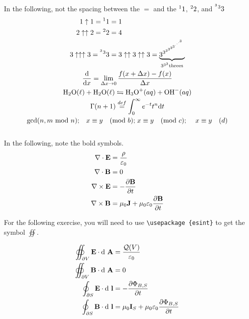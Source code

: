 \documentclass[a4paper]{article}
\newcommand{\ts}{\textsuperscript}
\begin{document}
	In the following, not the spacing between the $=$ and the
	${\ts 1} 1$, ${\ts 2} 2$, and ${\ts {\ts 3}} {\ts 3} 3$
	\begin{gather}
	\begin{split}
	1 \uparrow 1 = {\ts 1} 1 &= 1\\
	2 \uparrow \uparrow 2 = {\ts 2} 2 &= 4\\
	3 \uparrow \uparrow \uparrow 3 = {\ts {\ts 3}} {\ts 3} 3 &=
	3 \uparrow \uparrow 3 \uparrow \uparrow 3 =
	\underbrace{3 ^{3 ^{3 ^{3 ^{3 ^{3 ^{\cdot ^{ \cdot ^{\cdot ^{3}}}}}}}}}}
	_{3 ^{3 ^{3}} \text{threes}}
	\end{split}\\
	\frac{\text{d}}{\text{d}x} = \lim_{\Delta x \rightarrow 0}
	\frac{f(x + \Delta x) - f(x)}{\Delta x}\\
	\text{H}_2 \text{O}(\ell) + \text{H}_2 \text{O}(\ell)
	\leftrightharpoons \text{H}_3 \text{O} ^{+} (aq) +
	\text{OH} ^{-} (aq) \\
	\Gamma (n+1) \stackrel{def}{=} 
	\int_0 ^{\infty} e ^{-t}t ^n \text{d}t\\
	\text{gcd($n, m$ mod $n$);} \quad x \equiv y \quad \text{(mod $b$);}
	\; x \equiv y \quad \text{(mod $c$); } \quad x \equiv y \quad (d)
	\end{gather}\\
	
	In the following, note the bold symbols.
	\begin{gather}
		\begin{split}
			\nabla \cdot \text{\bf{E}} &= \frac{\rho}{\varepsilon_0}\\
			\nabla \cdot \text{\bf{B}} &= 0\\
			\nabla \times \text{\bf{E}} &= 
			-\frac{\partial \text{\bf{B}}}{\partial t}\\
			\nabla \times \text{\bf{B}} &= \mu_0\text{\bf{J}} +
			\mu_0\varepsilon_0 \frac{\partial \text{\bf{B}}}{\partial t}
		\end{split}
	\end{gather}
	
	For the following exercise, you will need to use 
	\texttt{\textbackslash usepackage \{esint\}}
	to get the symbol $\oiint$.
	
	\begin{gather}
		\begin{split}
			\oiint_{\partial V} \text{\bf{E}} \cdot \text{d \bf{A}} &=
			\frac{\mathcal{Q}(V)}{\varepsilon_0}\\
			\oiint_{\partial V} \text{\bf{B}} \cdot \text{d \bf{A}} &= 0\\
			\oint_{\partial S}  \text{\bf{E}} \cdot \text{d \bf{l}} &=
			-\frac{\partial \Phi_{B, S}}{\partial t}\\
			\oint_{\partial S} \text{\bf{B}} \cdot \text{d \bf{l}} &=
			\mu_0 {\bf{I}}_S + \mu_0 \varepsilon_0
			 \frac{\partial \Phi_{B, S}}{\partial t}
		\end{split}
	\end{gather}
	
\end{document}
